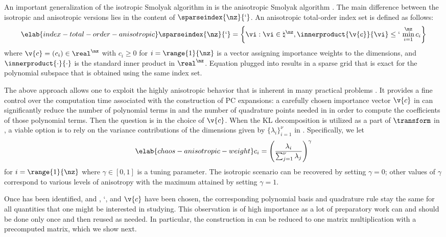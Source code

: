 An important generalization of the isotropic Smolyak algorithm in
 is the anisotropic Smolyak algorithm
\cite{nobile2008}. The main difference between the isotropic and anisotropic
versions lies in the content of $\sparseindex{\nz}{\lq}$. An anisotropic
total-order index set is defined as follows:
\begin{equation} \elab{index-total-order-anisotropic}
  \sparseindex{\nz}{\lq} = \left\{ \vi: \vi \in \natural^\nz, \innerproduct{\v{c}}{\vi} \leq \lq \, \min_{i = 1}^\nz c_i \right\}
\end{equation}
where $\v{c} = (c_i) \in \real^\nz$ with $c_i \geq 0$ for $i = \range{1}{\nz}$
is a vector assigning importance weights to the dimensions, and
$\innerproduct{\cdot}{\cdot}$ is the standard inner product in $\real^\nz$.
Equation  plugged into
 results in a sparse grid that is exact for the
polynomial subspace that is obtained using the same index set.

The above approach allows one to exploit the highly anisotropic behavior that is
inherent in many practical problems \cite{nobile2008}. It provides a fine
control over the computation time associated with the construction of \ac{PC}
expansions: a carefully chosen importance vector $\v{c}$ in
 can significantly reduce the number of
polynomial terms in  and the number of quadrature points
needed in  in order to compute the coefficients of those
polynomial terms. Then the question is in the choice of $\v{c}$. When the
\ac{KL} decomposition is utilized as a part of $\transform$ in
, a viable option is to rely on the variance
contributions of the dimensions given by $\{ \lambda_i \}_{i = 1}^\nu$ in
. Specifically, we let
\begin{equation} \elab{chaos-anisotropic-weight}
  c_i = \left(\frac{\lambda_i}{\sum_{j = 1}^\nu \lambda_j}\right)^\gamma
\end{equation}
for $i = \range{1}{\nz}$ where $\gamma \in [0, 1]$ is a tuning parameter. The
isotropic scenario can be recovered by setting $\gamma = 0$; other values of
$\gamma$ correspond to various levels of anisotropy with the maximum attained by
setting $\gamma = 1$.

Once \vz has been identified, and \lc, \lq, and $\v{c}$ have been chosen, the
corresponding polynomial basis and quadrature rule stay the same for all
quantities that one might be interested in studying. This observation is of high
importance as a lot of preparatory work can and should be done only once and
then reused as needed. In particular, the construction in 
can be reduced to one matrix multiplication with a precomputed matrix, which we
show next.

